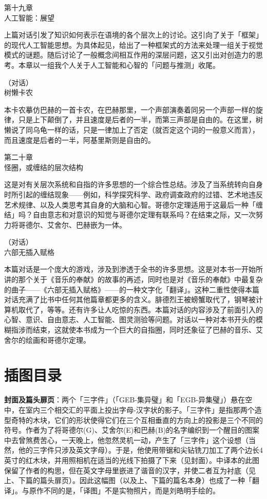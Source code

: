 \documentclass[
  12pt,
  twoside,
  openright,
  oldfontcommands,
]{memoir}
\newcommand{\kaitismall}[1]{{\kaitifamily\small #1}}
\begin{document}
第十九章\\
{人工智能：展望}

上篇对话引发了知识如何表示在语境的各个层次上的讨论。这引向了关于「框架」的现代人工智能思想。为具体起见，给出了一种框架式的方法来处理一组关于视觉模式的谜题。随后讨论了一般概念间相互作用的深层问题，这又引出对创造力的思考。本章以一组我个人关于人工智能和心智的「问题与推测」收尾。

（对话）\\
{树懒卡农}

本卡农摹仿巴赫的一首卡农，在巴赫那里，一个声部演奏着同另一个声部一样的旋律，只是上下颠倒了，并且速度是后者的一半，而第三声部是自由的。在这里，树懒说了同乌龟一样的话，只是一律加上了否定（就否定这个词的一般意义而言），而且速度是后者的一半，阿基里斯则是自由的。

第二十章\\
{怪圈，或缠结的层次结构}

这是对有关层次系统和自指的许多思想的一个综合性总结。涉及了当系统转向自身时所引起的缠结现象------例如，科学探究科学、政府调查政府的过错、艺术地违反艺术规律、以及人类思考其自身的大脑和心智。哥德尔定理适用于这最后一种「缠结」吗？自由意志和对意识的知觉与哥德尔定理有联系吗？在结束之际，又一次努力将哥德尔、艾舍尔、巴赫嵌为一体。

（对话）\\
{六部无插入赋格}

本篇对话是一个庞大的游戏，涉及到渗透于全书的许多思想。这是对本书一开始所讲的那个关于《音乐的奉献》的故事的再述，同时也是对《音乐的奉献》中最复杂的曲子------《六部无插入赋格》------的一种文字化「翻译」。这种二重性使得本篇对话充满了比书中任何其他篇章都更多的含义。腓德烈王被螃蟹取代了，钢琴被计算机取代了，等等。还有许多让人吃惊的东西。本篇对话的内容涉及了前面引入的心智、意识、自由意志、人工智能、图灵测验等问题。对话以一种对本书开头的模糊指涉而结束，这就使本书成为一个巨大的自指圈，同时还象征了巴赫的音乐、艾舍尔的绘画和哥德尔定理。

\label{List_of_Illustrations.xhtml}{}

\chapter*{\texorpdfstring{插图目录{}}{插图目录}}\label{List_of_Illustrations.xhtml_sigil_index_id_1}

\textbf{封面及篇头扉页}：两个「三字件」\kaitismall{（「GEB-集异璧」和「EGB-异集璧」）悬在空中，在室内三个相交汇的平面上投出字母-汉字状的影子。「三字件」是指那两个造型奇特的木块，它们的形状使得它们在三个互相垂直的方向上的投影是三个不同的符号。作者为了将哥德尔(G)、艾舍尔(E)和巴赫(B)的名字编织到一个醒目的图案中去曾煞费苦心，一天晚上，他忽然灵机一动，产生了「三字件」这个设想（当然，他的三字件只涉及英文字母）。于是，他使用带锯和尖钻铣刀加工了两个边长4英寸的红木块，并用照相机在适当的光线下拍摄了下来（见封面）。中译本的此图保留了作者的构思，但在英文字母里嵌进了谐音的汉字，并使二者互为衬底（见上、下篇的篇头扉页）。因此这幅图（以及上、下篇的篇名本身）也成了一种「翻译」。与原作不同的是，「译图」不是实物照片，而是刘皓明手绘的。}
\end{document}
